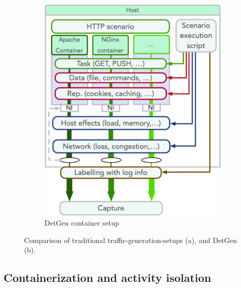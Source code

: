 \documentclass[runningheads]{llncs}
\begin{document}
\begin{figure}
\begin{subfigure}[b]{0.48\textwidth}
\includegraphics[width=\textwidth]{images/Docker_setup_final.png}
\vspace{0.0cm}
\vspace{-0.4cm}
\caption{DetGen container setup}
\end{subfigure}
\caption{Comparison of traditional traffic-generation-setups (a), and DetGen (b).}\label{Fig:Setup_comp}
\end{figure}

\subsection{Containerization and activity isolation}
\end{document}
